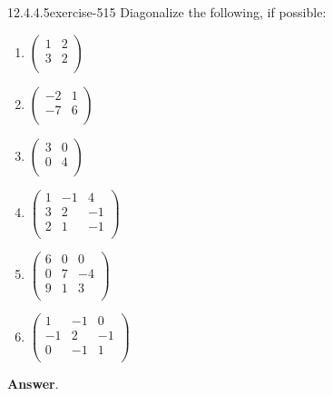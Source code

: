 \documentclass[twoside,10pt,]{book}
\numberwithin{equation}{section}
\begin{document}
\begin{divisionsolution}{12.4.4.5}{}{exercise-515}%
\hypertarget{p-4633}{}%
Diagonalize the following, if possible:\leavevmode%
\begin{multicols}{3}
\begin{enumerate}[label=(\alph*)]
\item\hypertarget{li-2112}{}\hypertarget{p-4634}{}%
\(\left(
\begin{array}{cc}
1 & 2 \\
3 & 2 \\
\end{array}
\right)\)%
\item\hypertarget{li-2113}{}\hypertarget{p-4635}{}%
\(\left(
\begin{array}{cc}
-2 & 1 \\
-7 & 6 \\
\end{array}
\right)\)%
\item\hypertarget{li-2114}{}\hypertarget{p-4636}{}%
\(\left(
\begin{array}{cc}
3 & 0 \\
0 & 4 \\
\end{array}
\right)\)%
\item\hypertarget{li-2115}{}\hypertarget{p-4637}{}%
\(\left(
\begin{array}{ccc}
1 & -1 & 4 \\
3 & 2 & -1 \\
2 & 1 & -1 \\
\end{array}
\right)\)%
\item\hypertarget{li-2116}{}\hypertarget{p-4638}{}%
\(\left(
\begin{array}{ccc}
6 & 0 & 0 \\
0 & 7 & -4 \\
9 & 1 & 3 \\
\end{array}
\right)\)%
\item\hypertarget{li-2117}{}\hypertarget{p-4639}{}%
\(\left(
\begin{array}{ccc}
1 & -1 & 0 \\
-1 & 2 & -1 \\
0 & -1 & 1 \\
\end{array}
\right)\)%
\end{enumerate}
\end{multicols}
%
\par\smallskip%
\noindent\textbf{Answer}.\quad%

\end{divisionsolution}
\end{document}
